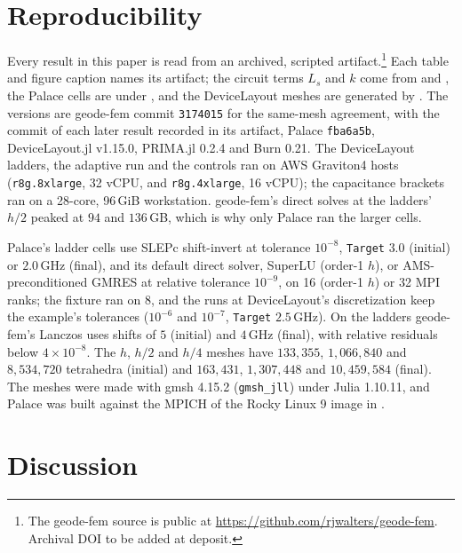 \documentclass{anvil-paper}
\begin{document}
\section{Reproducibility}
\label{sec:repro}

Every result in this paper is read from an archived, scripted
artifact.\footnote{The geode-fem source is public at
\url{https://github.com/rjwalters/geode-fem}. Archival DOI to be added at
deposit.}
Each table and figure caption names its artifact; the circuit terms $L_s$
and $k$ come from  and
, the Palace cells are under
, and the DeviceLayout meshes are
generated by . The versions are geode-fem commit
\texttt{3174015} for the same-mesh agreement, with the commit of each later
result recorded in its artifact, Palace \texttt{fba6a5b}, DeviceLayout.jl
v1.15.0, PRIMA.jl 0.2.4 and Burn 0.21. The DeviceLayout ladders, the
adaptive run and the controls ran on AWS Graviton4 hosts
(\texttt{r8g.8xlarge}, 32 vCPU, and \texttt{r8g.4xlarge}, 16 vCPU); the
capacitance brackets ran on a 28-core, 96\,GiB workstation. geode-fem's
direct solves at the ladders' $h/2$ peaked at $94$ and $136$\,GB, which is
why only Palace ran the larger cells.

Palace's ladder cells use SLEPc shift-invert at tolerance $10^{-8}$,
\texttt{Target} $3.0$ (initial) or $2.0$\,GHz (final), and its default
direct solver, SuperLU (order-1 $h$), or AMS-preconditioned GMRES at relative
tolerance $10^{-9}$, on 16 (order-1 $h$) or 32 MPI ranks; the fixture ran
on 8, and the runs at DeviceLayout's discretization keep the example's
tolerances ($10^{-6}$ and $10^{-7}$, \texttt{Target} $2.5$\,GHz). On the ladders geode-fem's
Lanczos uses shifts of $5$ (initial) and $4$\,GHz (final), with relative
residuals below $4\times10^{-8}$.
The $h$, $h/2$ and $h/4$ meshes have $133{,}355$, $1{,}066{,}840$ and
$8{,}534{,}720$ tetrahedra (initial) and $163{,}431$, $1{,}307{,}448$ and
$10{,}459{,}584$ (final). The meshes were made
with gmsh 4.15.2 (\texttt{gmsh\_jll}) under Julia 1.10.11, and Palace was
built against the MPICH of the Rocky Linux 9 image in
.

\section{Discussion}
\label{sec:discussion}
\end{document}
